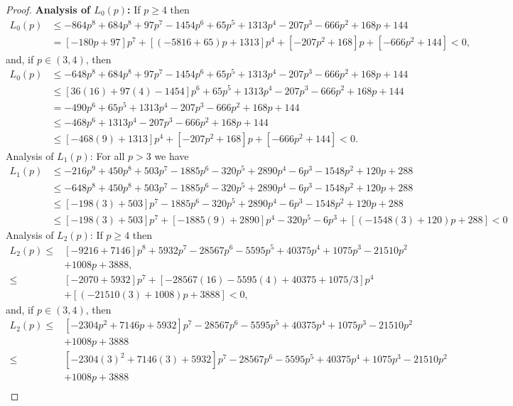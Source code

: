 \documentclass[11pt]{article}
\theoremstyle{definition}
\newcommand{\1}{\mathbf{1}}
\begin{document}
\begin{proof}
\noindent\textbf{Analysis of $L_0(p)$:} If $p\geq 4$ then
\begin{align*}
    L_0(p)&\leq -864p^8+ 684 p^8 + 97 p^7 -1454 p^6 +65 p^5 +1313 p^4 -207 p^3 -666 p^2 +168 p +144\\
    &=[-180p+97]p^7+[(-5816+65)p+1313]p^4+[-207p^2+168]p+[-666p^2+144]<0,
\end{align*}
and, if $p\in(3,4)$, then
\begin{align*}
    L_0(p)&\leq -648p^8+ 684 p^8 + 97 p^7 -1454 p^6 +65 p^5 +1313 p^4 -207 p^3 -666 p^2 +168 p +144\\
    &\leq[36(16)+97(4)-1454]p^6+65 p^5 +1313 p^4 -207 p^3 -666 p^2 +168 p +144\\
    &=-490p^6+65 p^5 +1313 p^4 -207 p^3 -666 p^2 +168 p +144\\
    &\leq -468p^6+1313 p^4 -207 p^3 -666 p^2 +168 p +144\\
    &\leq [-468(9)+1313]p^4+[-207p^2+168]p+[-666p^2+144]<0.
\end{align*}
{{Analysis of $L_1(p)$:}} For all $p>3$ we have
\begin{align*}
    L_1(p)&\leq -216 p^9 +450 p^8 +503 p^7 -1885 p^6 -320 p^5 +2890 p^4 -6 p^3 -1548 p^2 +120 p +288\\
    &\leq-648p^8 +450 p^8 +503 p^7 -1885 p^6 -320 p^5 +2890 p^4 -6 p^3 -1548 p^2 +120 p +288\\
    &\leq [-198(3)+503]p^7 -1885 p^6 -320 p^5 +2890 p^4 -6 p^3 -1548 p^2 +120 p +288\\
    &\leq[-198(3)+503]p^7+[-1885(9)+2890]p^4 -320 p^5-6 p^3+[(-1548(3)+120)p+288]<0
\end{align*}
{{Analysis of $L_2(p)$:}}
If $p\geq 4$ then
\begin{align*}
    L_2(p)\leq& [-9216+7146]p^8 +5932 p^7 -28567 p^6 -5595 p^5 +40375 p^4 +1075 p^3 -21510 p^2\\& +1008 p +3888,\\
    \leq& [-2070+5932]p^7+[-28567(16)-5595(4)+40375+1075/3]p^4\\
    &+[(-21510(3)+1008)p+3888]<0,
\end{align*}
and, if $p\in(3,4)$, then
\begin{align*}
  L_2(p)\leq& [-2304p^2+7146p+5932]p^7 -28567 p^6 -5595 p^5 +40375 p^4 +1075 p^3 -21510 p^2\\& +1008 p +3888\\
    \leq& [-2304(3)^2+7146(3)+5932]p^7 -28567 p^6 -5595 p^5 +40375 p^4 +1075 p^3 -21510 p^2\\& +1008 p +3888\\

\end{align*}
\end{proof}
\end{document}
